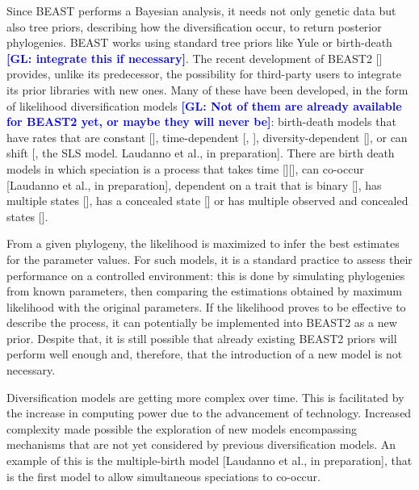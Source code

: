 \documentclass{article}
\newcommand{\giovanni}[1]{\textcolor{blue}{\textbf{[GL: #1]}}}
\begin{document}
Since BEAST performs a Bayesian analysis, 
it needs not only genetic data but also tree priors, 
describing how the diversification occur, to return posterior phylogenies.
BEAST works using standard tree priors like Yule or birth-death 
\giovanni{integrate this if necessary}.
The recent development of BEAST2 [\cite{bouckaert2014beast}] provides, 
unlike its predecessor, the possibility for third-party users 
to integrate its prior libraries with new ones. 
Many of these have been developed, 
in the form of likelihood diversification models \giovanni{Not of them are already available for BEAST2 yet, or maybe they will never be}: 
birth-death models that have rates that are 
constant [\cite{nee1994reconstructed}], 
time-dependent [\cite{nee1994reconstructed}, \cite{rabosky2008explosive}], 
diversity-dependent [\cite{etienne2011diversity}],
or can shift [\cite{etienne2012conceptual}, the SLS model. Laudanno et al., in preparation].
There are birth death models in which speciation is a process that takes time [\cite{rosindell2010protracted}][\cite{etienne2012prolonging}], can co-occur [Laudanno et al., in preparation],
dependent on a trait that is binary [\cite{maddison2007estimating}], 
has multiple states [\cite{fitzjohn2012diversitree}],
has a concealed state [\cite{beaulieu2016detecting}] 
or has multiple observed and concealed states [\cite{herrera2018detecting}]. 

From a given phylogeny, the likelihood is maximized
to infer the best estimates for the parameter values.
For such  models, it is a standard practice to assess their performance 
on a controlled environment: this is done by simulating phylogenies from known parameters, 
then comparing the estimations obtained by maximum likelihood with the original parameters.
If the likelihood proves to be effective to describe the process, 
it can potentially be implemented into BEAST2 as a new prior. 
Despite that, it is still possible that already existing BEAST2 priors 
will perform well enough and, therefore, 
that the introduction of a new model is not necessary.

Diversification models are getting more complex over time. 
This is facilitated by the increase in computing power due to the advancement of technology.
Increased complexity made possible the exploration of new models 
encompassing mechanisms that are not yet considered by previous diversification models. 
An example of this is the multiple-birth model [Laudanno et al., in preparation],
that is the first model to allow simultaneous speciations to co-occur.
\end{document}
